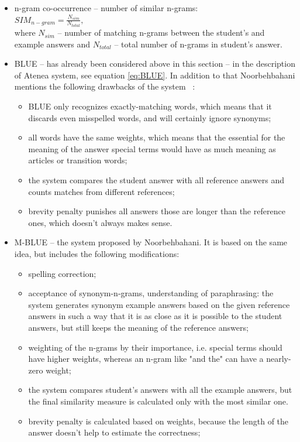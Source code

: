 \documentclass[11pt]{report}
\numberwithin{equation}{section} %
\begin{document}
\begin{itemize}
\item n-gram co-occurrence --  number of similar n-grams:\\
$SIM_{n-gram} = \frac{N_{sim}}{N_{total}},$\\
where $N_{sim}$ -- number of matching n-grams between the student's and example answers and $N_{total}$ -- total number of n-grams in student's answer.
\item BLUE -- has already been considered above in this section -- in the description of Atenea system, see equation \ref{eq:BLUE}. In addition to that
Noorbehbahani mentions the following drawbacks of the system ~\cite{Noorbehbahani}:
\begin{itemize}
\item BLUE only recognizes exactly-matching words, which means that it discards even misspelled words, and will certainly ignore synonyms;
\item all words have the same weights, which means that the essential for the meaning of the answer special terms would have as much meaning as articles or transition words;
\item the system compares the student answer with all reference answers and counts matches from different references;
\item brevity penalty punishes all answers those are longer than the reference ones, which doesn't always makes sense.
\end{itemize}
\item M-BLUE -- the system proposed by Noorbehbahani. It is based on the same idea, but includes the following modifications:
\begin{itemize}
\item spelling correction;
\item acceptance of synonym-n-grams, understanding of paraphrasing: the system generates synonym example answers based on the given reference answers in such a way that it is as close as it is possible to the student answers, but still keeps the meaning of the reference answers;
\item weighting of the n-grams by their importance, i.e. special terms should have higher weights, whereas an n-gram like "and the" can have a nearly-zero weight;
\item the system compares student's answers with all the example answers, but the final similarity measure is calculated only with the most similar one.
\item brevity penalty is calculated based on weights, because the length of the answer doesn't help to estimate the correctness;

\end{itemize}
\end{itemize}
\end{document}

